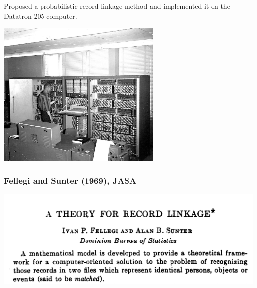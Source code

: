 \documentclass[compress]{beamer}
\newcommand{\1}[1]{\mathbb{I}\!\left[#1\right]} %
\theoremstyle{plain}
\begin{document}
\begin{frame}

Proposed a probabilistic record linkage method and implemented it on the Datatron 205 computer.

\begin{center}
    \includegraphics[width=0.6\textwidth]{finalFigures/datatron}
\end{center}

\end{frame}




\begin{frame}
\frametitle{Fellegi and Sunter (1969), JASA}
\begin{center}
    \includegraphics[width=\linewidth]{finalFigures/FS}
\end{center}

\end{frame}




\end{document}
